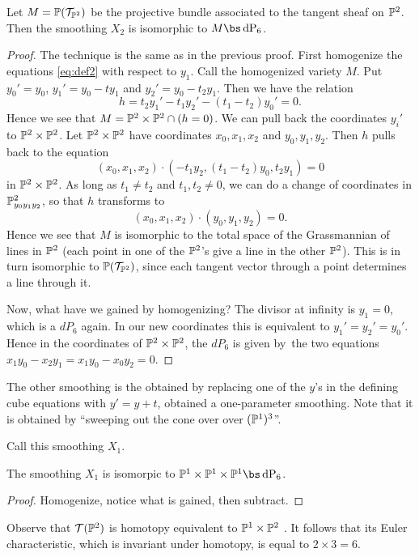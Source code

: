 \begin{lemma}
Let $M=\P(\mathcal T_ {\P^2})$ be the projective bundle associated to the tangent sheaf on $\P^2$. Then the smoothing $X_2$ is isomorphic to $M \bs \dP6$. 
\end{lemma}
\begin{proof}
The technique is the same as in the previous proof. First homogenize the equations \eqref{eq:def2} with respect to $y_1$. Call the homogenized variety $M$. Put $y_0'=y_0$, $y_1' = y_0-ty_1$ and $y_2'=y_0-t_2y_1$. Then we have the relation
\[
h = t_2y_1'-t_1y_2' - (t_1-t_2)y_0' = 0.
\]
Hence we see that $M=\P^2 \times \P^2 \cap (h = 0)$. We can pull back the coordinates $y_i'$ to $\P^2 \times \P^2$. Let $\P^2 \times \P^2$ have coordinates $x_0,x_1,x_2$ and $y_0,y_1,y_2$. Then $h$ pulls back to the equation
\[
(x_0,x_1,x_2) \cdot (-t_1y_2, (t_1-t_2)y_0,t_2y_1) = 0
\]
in $\P^2 \times \P^2$. As long as $t_1 \neq t_2$ and $t_1,t_2 \neq 0$, we can do a change of coordinates in $\P^2_{y_0y_1y_2}$, so that $h$ transforms to
\[
(x_0,x_1,x_2) \cdot(y_0,y_1,y_2) = 0.
\]
Hence we see that $M$ is isomorphic to the total space of the Grassmannian of lines in $\P^2$ (each point in one of the $\P^2$'s give a line in the other $\P^2$). This is in turn isomorphic to $\P(\mathcal T_{\P^2})$, since each tangent vector through a point determines a line through it.

Now, what have we gained by homogenizing? The divisor at infinity is $y_1=0$, which is a $dP_6$ again. In our new coordinates this is equivalent to $y_1'=y_2'=y_0'$. Hence in the coordinates of $\P^2 \times \P^2$, the $dP_6$ is given by the two equations $x_1y_0-x_2y_1=x_1y_0-x_0y_2=0$. 
\end{proof}

The other smoothing is the obtained by replacing one of the $y$'s in the defining cube equations  with $y'=y+t$, obtained a one-parameter smoothing. Note that it is obtained by ``sweeping out the cone over over $(\P^1)^3$''.

Call this smoothing $X_1.$

\begin{lemma}
The smoothing $X_1$ is isomorpic to $\P^1 \times \P^1 \times \P^1 \bs \dP6$.
\end{lemma}
\begin{proof}
Homogenize, notice what is gained, then subtract.
\end{proof}

Observe that $\mathcal T(\P^2)$ is homotopy equivalent to $\P^1 \times \P^2$ . It follows that its Euler characteristic, which is invariant under homotopy, is equal to $2 \times 3=6$.

